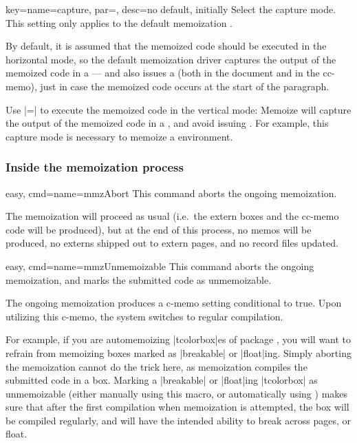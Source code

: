 \documentclass[a4paper,11pt]{article}
\begin{document}
\begin{doc}{
    key={name=capture, par=,
      desc={no default, initially }}
  }
  Select the capture mode.  This setting only applies to the default
  memoization .

  By default, it is assumed that the memoized code should be executed in the
  horizontal mode, so the default memoization driver captures the output of the
  memoized code in a  --- and also issues a 
  (both in the document and in the cc-memo), just in case the memoized code
  occurs at the start of the paragraph.

  Use |=| to execute the memoized code in
  the vertical mode: Memoize will capture the output of the memoized code in a
  , and avoid issuing .  For example, this
  capture mode is necessary to memoize a  environment.
\end{doc}


\subsubsection{Inside the memoization process}
\label{sec:ref:memoization:process}

\begin{doc}{easy, cmd={name=mmzAbort}}
  This command aborts the ongoing memoization.

  The memoization will proceed as usual (i.e.\ the extern boxes and the cc-memo
  code will be produced), but at the end of this process, no memos will be
  produced, no externs shipped out to extern pages, and no record files
  updated.
\end{doc}

\begin{doc}{easy, cmd={name=mmzUnmemoizable}}
  This command aborts the ongoing memoization, and marks the submitted code as
  unmemoizable.

  The ongoing memoization produces a c-memo setting conditional
   to true.  Upon utilizing this c-memo, the
  system switches to regular compilation.

  For example, if you are automemoizing |tcolorbox|es of package
  , you will want to refrain from memoizing boxes marked as
  |breakable| or |float|ing.  Simply aborting the memoization cannot do the
  trick here, as memoization compiles the submitted code in a  box.
  Marking a |breakable| or |float|ing |tcolorbox| as unmemoizable (either
  manually using this macro, or automatically using ) makes
  sure that after the first compilation when memoization is attempted, the box
  will be compiled regularly, and will have the intended ability to break
  across pages, or float.
\end{doc}
\end{document}
